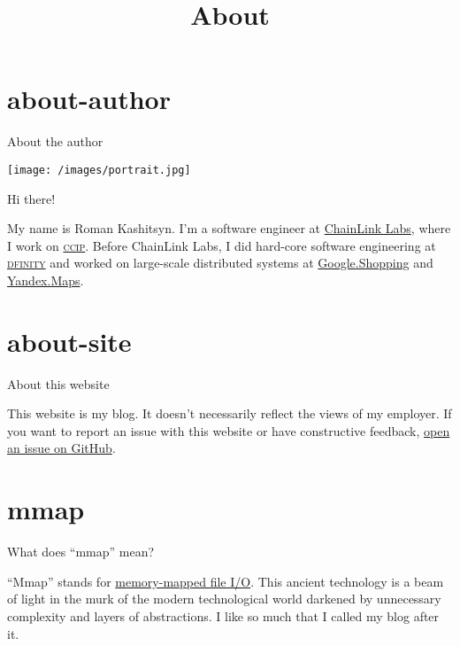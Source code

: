 \documentclass{article}
\title{About}
\begin{document}
\section{about-author}{About the author}

\texttt{[image: /images/portrait.jpg]}

Hi there!

My name is Roman Kashitsyn.
I'm a software engineer at \href{https://chainlinklabs.com/}{ChainLink Labs}, where I work on \href{https://chain.link/cross-chain}{\textsc{ccip}}.
Before ChainLink Labs, I did hard-core software engineering at \href{https://dfinity.org}{\textsc{dfinity}} and worked on large-scale distributed systems at \href{https://shopping.google.com/}{Google.Shopping} and \href{https://yandex.ru/maps}{Yandex.Maps}.

\section{about-site}{About this website}

This website is my blog.
It doesn't necessarily reflect the views of my employer.
If you want to report an issue with this website or have constructive feedback, \href{https://github.com/roman-kashitsyn/mmapped.blog/issues/new}{open an issue on GitHub}.

\section{mmap}{What does ``mmap'' mean?}

``Mmap'' stands for \href{https://en.wikipedia.org/wiki/Mmap}{memory-mapped file I/O}.
This ancient technology is a beam of light in the murk of the modern technological world darkened by unnecessary complexity and layers of abstractions.
I like \href{https://www.man7.org/linux/man-pages/man2/mmap.2.html}{} so much that I called my blog after it.
\end{document}
